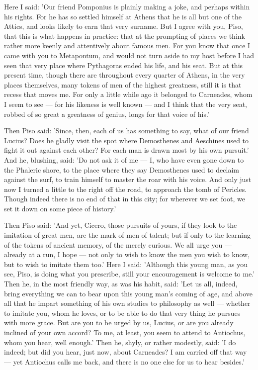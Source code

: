  Here I said: 'Our friend Pomponius is plainly making a joke, and perhaps within his rights. For he has so settled himself at Athens that he is all but one of the Attics, and looks likely to earn that very surname. But I agree with you, Piso, that this is what happens in practice: that at the prompting of places we think rather more keenly and attentively about famous men. For you know that once I came with you to Metapontum, and would not turn aside to my host before I had seen that very place where Pythagoras ended his life, and his seat. But at this present time, though there are throughout every quarter of Athens, in the very places themselves, many tokens of men of the highest greatness, still it is that recess that moves me. For only a little while ago it belonged to Carneades, whom I seem to see — for his likeness is well known — and I think that the very seat, robbed of so great a greatness of genius, longs for that voice of his.'

 Then Piso said: 'Since, then, each of us has something to say, what of our friend Lucius? Does he gladly visit the spot where Demosthenes and Aeschines used to fight it out against each other? For each man is drawn most by his own pursuit.' And he, blushing, said: 'Do not ask it of me — I, who have even gone down to the Phaleric shore, to the place where they say Demosthenes used to declaim against the surf, to train himself to master the roar with his voice. And only just now I turned a little to the right off the road, to approach the tomb of Pericles. Though indeed there is no end of that in this city; for wherever we set foot, we set it down on some piece of history.'

 Then Piso said: 'And yet, Cicero, those pursuits of yours, if they look to the imitation of great men, are the mark of men of talent; but if only to the learning of the tokens of ancient memory, of the merely curious. We all urge you — already at a run, I hope — not only to wish to know the men you wish to know, but to wish to imitate them too.' Here I said: 'Although this young man, as you see, Piso, is doing what you prescribe, still your encouragement is welcome to me.' Then he, in the most friendly way, as was his habit, said: 'Let us all, indeed, bring everything we can to bear upon this young man's coming of age, and above all that he impart something of his own studies to philosophy as well — whether to imitate you, whom he loves, or to be able to do that very thing he pursues with more grace. But are you to be urged by us, Lucius, or are you already inclined of your own accord? To me, at least, you seem to attend to Antiochus, whom you hear, well enough.' Then he, shyly, or rather modestly, said: 'I do indeed; but did you hear, just now, about Carneades? I am carried off that way — yet Antiochus calls me back, and there is no one else for us to hear besides.'

